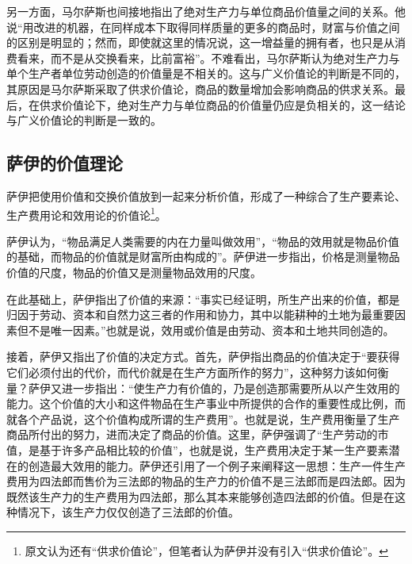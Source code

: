 另一方面，马尔萨斯也间接地指出了绝对生产力与单位商品价值量之间的关系。他说“用改进的机器，在同样成本下取得同样质量的更多的商品时，财富与价值之间的区别是明显的；然而，即使就这里的情况说，这一增益量的拥有者，也只是从消费看来，而不是从交换看来，比前富裕”\cite[291]{BiLuo*SiLaFaDaWeiLiJiaTuQuanJiDi2JuanMaErSaSiZhengZhiJingJiXueYuanLiPingZhu2013}。不难看出，马尔萨斯认为绝对生产力与单个生产者单位劳动创造的价值量是不相关的。这与广义价值论的判断是不同的，其原因是马尔萨斯采取了供求价值论，商品的数量增加会影响商品的供求关系。最后，在供求价值论下，绝对生产力与单位商品的价值量仍应是负相关的，这一结论与广义价值论的判断是一致的。

\subsection{萨伊的价值理论}

萨伊把使用价值和交换价值放到一起来分析价值，形成了一种综合了生产要素论、生产费用论和效用论的价值论\footnote{原文认为还有“供求价值论”，但笔者认为萨伊并没有引入“供求价值论”。}\cite[138]{YanZhiJieXiFangJingJiXueShuoShiJiaoChengDiErBan2013}。

萨伊认为，“物品满足人类需要的内在力量叫做效用”，“物品的效用就是物品价值的基础，而物品的价值就是财富所由构成的”\cite[59]{SaYiZhengZhiJingJiXueGaiLunCaiFuDeShengChanFenPeiHeXiaoFei2020}。萨伊进一步指出，价格是测量物品价值的尺度，物品的价值又是测量物品效用的尺度\cite[60]{SaYiZhengZhiJingJiXueGaiLunCaiFuDeShengChanFenPeiHeXiaoFei2020}。

在此基础上，萨伊指出了价值的来源：“事实已经证明，所生产出来的价值，都是归因于劳动、资本和自然力这三者的作用和协力，其中以能耕种的土地为最重要因素但不是唯一因素。”\cite[78]{SaYiZhengZhiJingJiXueGaiLunCaiFuDeShengChanFenPeiHeXiaoFei2020}也就是说，效用或价值是由劳动、资本和土地共同创造的。

接着，萨伊又指出了价值的决定方式。首先，萨伊指出商品的价值决定于“要获得它们必须付出的代价，而代价就是在生产方面所作的努力”\cite[351]{SaYiZhengZhiJingJiXueGaiLunCaiFuDeShengChanFenPeiHeXiaoFei2020}，这种努力该如何衡量？萨伊又进一步指出：“使生产力有价值的，乃是创造那需要所从以产生效用的能力。这个价值的大小和这件物品在生产事业中所提供的合作的重要性成比例，而就各个产品说，这个价值构成所谓的生产费用”\cite[352]{SaYiZhengZhiJingJiXueGaiLunCaiFuDeShengChanFenPeiHeXiaoFei2020}。也就是说，生产费用衡量了生产商品所付出的努力，进而决定了商品的价值。这里，萨伊强调了“生产劳动的市值，是基于许多产品相比较的价值”\cite[352]{SaYiZhengZhiJingJiXueGaiLunCaiFuDeShengChanFenPeiHeXiaoFei2020}，也就是说，生产费用决定于某一生产要素潜在的创造最大效用的能力。萨伊还引用了一个例子来阐释这一思想：生产一件生产费用为四法郎而售价为三法郎的物品的生产力的价值不是三法郎而是四法郎。因为既然该生产力的生产费用为四法郎，那么其本来能够创造四法郎的价值。但是在这种情况下，该生产力仅仅创造了三法郎的价值\cite[352]{SaYiZhengZhiJingJiXueGaiLunCaiFuDeShengChanFenPeiHeXiaoFei2020}。

